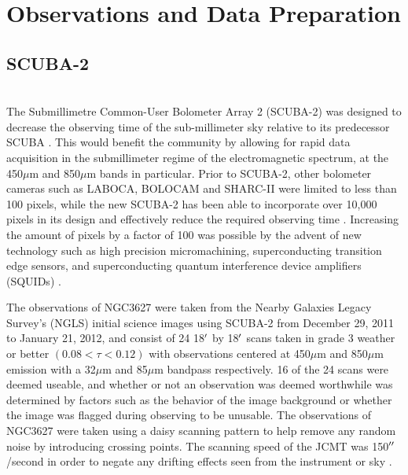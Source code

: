 \chapter{Observations and Data Preparation}\label{observations}

\section{SCUBA-2} \\
The Submillimetre Common-User Bolometer Array 2 (SCUBA-2) was designed to decrease the observing time of the sub-millimeter sky relative to its predecessor SCUBA \citep{holland2013}.  This would benefit the community by allowing for rapid data acquisition in the submillimeter regime of the electromagnetic spectrum, at the 450$\mu$m and 850$\mu$m bands in particular.  Prior to SCUBA-2, other bolometer cameras such as LABOCA, BOLOCAM and SHARC-II were limited to less than 100 pixels, while the new SCUBA-2 has been able to incorporate over 10,000 pixels in its design and effectively reduce the required observing time \citep{chapin2013}.  Increasing the amount of pixels by a factor of 100 was possible by the advent of new technology such as high precision micromachining, superconducting transition edge sensors, and superconducting quantum interference device amplifiers (SQUIDs) \citep{holland2013}.

The observations of NGC3627 were taken from the Nearby Galaxies Legacy Survey's (NGLS) initial science images using SCUBA-2 from December 29, 2011  to January 21, 2012, and consist of 24 18$\mbox{$^\prime$}$ by 18$\mbox{$^\prime$}$ scans taken in grade 3 weather or better $(0.08 < \tau <0.12)$ with observations centered at 450$\mu$m and 850$\mu$m emission with a 32$\mu$m and 85$\mu$m bandpass respectively.  16 of the 24 scans were deemed useable, and whether or not an observation was deemed worthwhile was determined by factors such as the behavior of the image background or whether the image was flagged during observing to be unusable.  The observations of NGC3627 were taken using a daisy scanning pattern  to help remove any random noise by introducing crossing points.  The scanning speed of the JCMT was 150$\mbox{$^{\prime\prime}$}$/second in order to negate any drifting effects seen from the instrument or sky \citep{chapin2013}.

